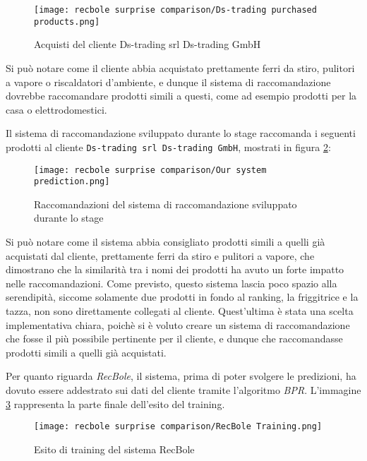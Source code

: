\newpage

\begin{figure}[h]
    \centering
    \texttt{[image: recbole surprise comparison/Ds-trading purchased products.png]}
    \caption{Acquisti del cliente Ds-trading srl Ds-trading GmbH}
    \label{fig:recbole-surprise-orders-export}
\end{figure}

Si può notare come il cliente abbia acquistato prettamente ferri da stiro, pulitori a vapore o riscaldatori d'ambiente, e dunque il sistema di raccomandazione dovrebbe raccomandare prodotti simili a questi, come ad esempio prodotti per la casa o elettrodomestici.

Il sistema di raccomandazione sviluppato durante lo stage raccomanda i seguenti prodotti al cliente \texttt{Ds-trading srl Ds-trading GmbH}, mostrati in figura \ref{fig:our-system-recommendations}:

\begin{figure}[h]
    \centering
    \texttt{[image: recbole surprise comparison/Our system prediction.png]}
    \caption{Raccomandazioni del sistema di raccomandazione sviluppato durante lo stage}
    \label{fig:our-system-recommendations}
\end{figure}

Si può notare come il sistema abbia consigliato prodotti simili a quelli già acquistati dal cliente, prettamente ferri da stiro e pulitori a vapore, che dimostrano che la similarità tra i nomi dei prodotti ha avuto un forte impatto nelle raccomandazioni. Come previsto, questo sistema lascia poco spazio alla serendipità, siccome solamente due prodotti in fondo al ranking, la friggitrice e la tazza, non sono direttamente collegati al cliente. Quest'ultima è stata una scelta implementativa chiara, poichè si è voluto creare un sistema di raccomandazione che fosse il più possibile pertinente per il cliente, e dunque che raccomandasse prodotti simili a quelli già acquistati.

Per quanto riguarda \emph{RecBole}, il sistema, prima di poter svolgere le predizioni, ha dovuto essere addestrato sui dati del cliente tramite l'algoritmo \emph{BPR}. L'immagine \ref{fig:recbole-training-outcome} rappresenta la parte finale dell'esito del training.

\newpage

\begin{figure}[h]
    \centering
    \texttt{[image: recbole surprise comparison/RecBole Training.png]}
    \caption{Esito di training del sistema RecBole}
    \label{fig:recbole-training-outcome}
\end{figure}

